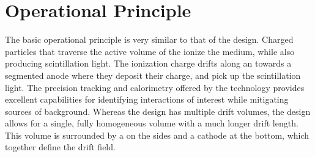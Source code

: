 
\section{\dual \lartpc Operational Principle}
\label{sec:fddp-operational-principle}


The basic operational principle is very similar to that of the \single design. 
Charged particles that traverse the active volume of the \lartpc ionize the medium, while also producing scintillation light.  The ionization charge drifts along an \efield towards a segmented anode where they deposit their charge, and  pick up the scintillation light.
The precision tracking and calorimetry offered by the \dual
technology provides excellent capabilities for identifying interactions of interest while mitigating sources of background.  
Whereas the \single design has multiple drift volumes, the  design allows for a single, fully homogeneous \lar volume with a much longer drift length. This volume is surrounded by a  on the sides and a cathode at the bottom, which together define the drift field.  

